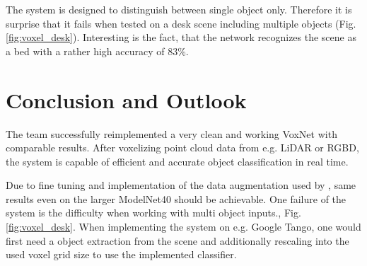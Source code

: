 \documentclass[10pt,twocolumn,letterpaper]{article}
\begin{document}
The system  is designed to distinguish between single object only. Therefore it is surprise that it fails when
tested on a desk scene including multiple objects (Fig. \ref{fig:voxel_desk}). Interesting is the fact, that the network 
recognizes the scene as a bed with a rather high accuracy of 83\%.

\section{Conclusion and Outlook}

The team successfully reimplemented a very clean and working VoxNet with comparable results.
After voxelizing point cloud data from e.g. LiDAR or RGBD, the system is capable of efficient and accurate object classification in real time. 

Due to fine tuning and implementation of the data augmentation used by \cite{voxnet}, same results even on the larger ModelNet40 
should be achievable. One failure of the system is the difficulty when working with multi object inputs., Fig. \ref{fig:voxel_desk}. 
When implementing the system on e.g. Google Tango, one would first need a object extraction from the scene and 
additionally rescaling into the used voxel grid size to use the implemented classifier. 

{\small


}
\end{document}
